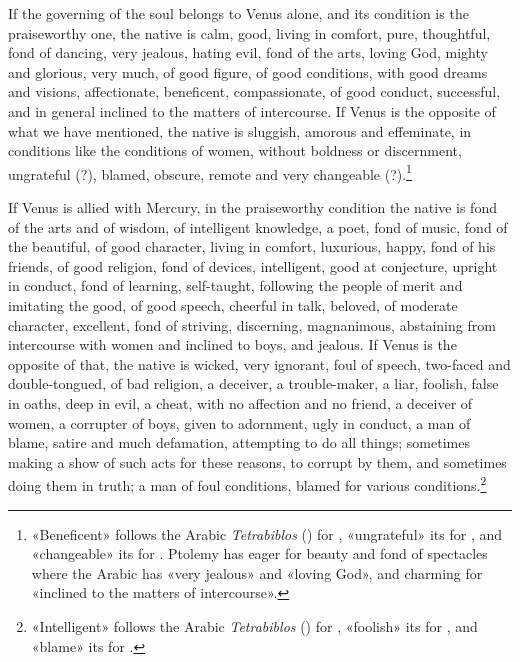 \documentclass[11pt]{article}
\newcommand{\Fol}[1]{\marginpar{\footnotesize\color{gray}f.\,#1}}
\begin{document}
\par If the governing of the soul belongs to Venus alone, and its condition is the praiseworthy one, the native is calm, good, living in comfort, pure, thoughtful, fond of dancing, very jealous, hating evil, fond of the arts, loving God, mighty and glorious, very much, of good figure, of good conditions, with good dreams and visions, affectionate, beneficent, compassionate, of good conduct, successful, and in general inclined to the matters of intercourse. If Venus is the opposite of what we have mentioned, the native is sluggish, amorous and effeminate, in conditions like the conditions of women, without boldness or discernment, ungrateful (?), blamed, obscure, remote and very changeable (?).\footnote{«Beneficent» follows the Arabic \emph{Tetrabiblos} () for , «ungrateful» its  for , and «changeable» its  for . Ptolemy has eager for beauty and fond of spectacles where the Arabic has «very jealous» and «loving God», and charming for «inclined to the matters of intercourse».}\par
\par \Fol{60v}If Venus is allied with Mercury, in the praiseworthy condition the native is fond of the arts and of wisdom, of intelligent knowledge, a poet, fond of music, fond of the beautiful, of good character, living in comfort, luxurious, happy, fond of his friends, of good religion, fond of devices, intelligent, good at conjecture, upright in conduct, fond of learning, self-taught, following the people of merit and imitating the good, of good speech, cheerful in talk, beloved, of moderate character, excellent, fond of striving, discerning, magnanimous, abstaining from intercourse with women and inclined to boys, and jealous. If Venus is the opposite of that, the native is wicked, very ignorant, foul of speech, two-faced and double-tongued, of bad religion, a deceiver, a trouble-maker, a liar, foolish, false in oaths, deep in evil, a cheat, with no affection and no friend, a deceiver of women, a corrupter of boys, given to adornment, ugly in conduct, a man of blame, satire and much defamation, attempting to do all things; sometimes making a show of such acts for these reasons, to corrupt by them, and sometimes doing them in truth; a man of foul conditions, blamed for various conditions.\footnote{«Intelligent» follows the Arabic \emph{Tetrabiblos} () for , «foolish» its  for , and «blame» its  for .}\par
\end{document}
